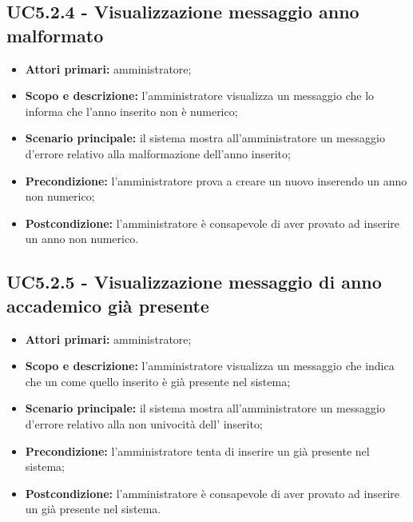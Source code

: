 \documentclass[AnalisiDeiRequisiti.tex]{subfiles}
\begin{document}
\subsection{UC5.2.4 - Visualizzazione messaggio anno malformato}
\begin{itemize}
	\item \textbf{Attori primari:} amministratore;
	\item \textbf{Scopo e descrizione:} l'amministratore visualizza un messaggio che lo informa che l'anno inserito non è numerico;
	\item \textbf{Scenario principale:} il sistema mostra all'amministratore un messaggio d'errore relativo alla malformazione dell'anno inserito;
	\item \textbf{Precondizione:} l'amministratore prova a creare un nuovo  inserendo un anno non numerico; 
	\item \textbf{Postcondizione:} l'amministratore è consapevole di aver provato ad inserire un anno non numerico.
\end{itemize}
\subsection{UC5.2.5 - Visualizzazione messaggio di anno accademico già presente}
\begin{itemize}
	\item \textbf{Attori primari:} amministratore;
	\item \textbf{Scopo e descrizione:} l'amministratore visualizza un messaggio che indica che un  come quello inserito è già presente nel sistema;
	\item \textbf{Scenario principale:} il sistema mostra all'amministratore un messaggio d'errore relativo alla non univocità dell' inserito;
	\item \textbf{Precondizione:} l'amministratore tenta di inserire un  già presente nel sistema; 
	\item \textbf{Postcondizione:} l'amministratore è consapevole di aver provato ad inserire un  già presente nel sistema.
\end{itemize}
\end{document}
